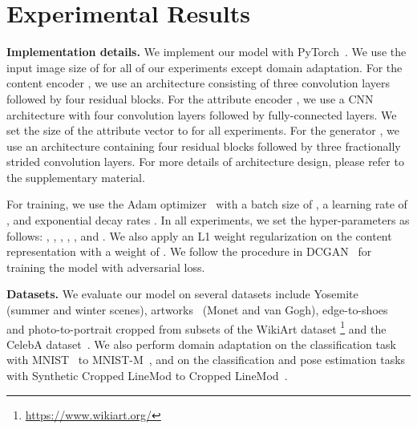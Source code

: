 \documentclass[runningheads]{llncs}
\newlength\paramargin
\newlength\secmargin
\newcommand{\Paragraph}[1]
{\vspace{2mm} \noindent \textbf{#1}}
\begin{document}
\section{Experimental Results}
\label{sec:experiments}
\vspace{\secmargin}
\vspace{-1mm}
\Paragraph{Implementation details.}
We implement our model with PyTorch~\cite{paszke2017pytorch}.
We use the input image size of  for all of our experiments except domain adaptation.
For the content encoder , we use an architecture consisting of three convolution layers followed by four residual blocks.
For the attribute encoder , we use a CNN architecture with four convolution layers followed by fully-connected layers.
We set the size of the attribute vector to  for all experiments.
For the generator , we use an architecture containing four residual blocks followed by three fractionally strided convolution layers.
For more details of architecture design, please refer to the supplementary material.

For training, we use the Adam optimizer~\cite{kinga2015adam} with a batch size of , a learning rate of , and exponential decay rates .
In all experiments, we set the hyper-parameters as follows: , , , ,  , and . 
We also apply an L1 weight regularization on the content representation with a weight of . 
We follow the procedure in DCGAN~\cite{radford2016dcgan} for training the model with adversarial loss.

\vspace{\paramargin}
\Paragraph{Datasets.}
We evaluate our model on several datasets include Yosemite~\cite{zhu2017cyclegan} (summer and winter scenes), artworks~\cite{zhu2017cyclegan} (Monet and van Gogh), edge-to-shoes~\cite{Yu2014edge2shoe} and photo-to-portrait cropped from subsets of the WikiArt dataset \footnote{\url{https://www.wikiart.org/}} and the CelebA dataset~\cite{liu2015celeb}. 
We also perform domain adaptation on the classification task with MNIST~\cite{lecun1998MNIST} to MNIST-M~\cite{ganin2016MNISTM}, and on the classification and pose estimation tasks with Synthetic Cropped LineMod to Cropped LineMod~\cite{hinterstoisser2012linemod,wohlhart2015croplinemod}.
\end{document}
